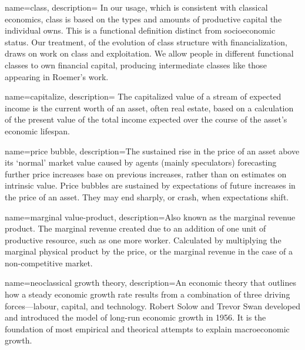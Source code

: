 {
name=class,
description={%
In our usage, which is consistent with classical economics, %
class is based on the types and amounts of productive capital the individual owns. This is a functional definition distinct from socioeconomic status. %
Our treatment, of the evolution of class structure with financialization, draws on \cite{roemerGeneralTheoryExploitation1982} work on class and exploitation. We allow people in different functional classes to own financial capital, producing intermediate classes like those appearing in Roemer's work. %
}
}

{
name=capitalize,
description={%
The capitalized value of a stream of expected income %
is the current worth of an asset, often real estate, based on a calculation of the present value of the total income expected over the course of the asset's economic lifespan.}
}

{
name=price bubble,
description={The sustained rise in the price of an asset above its `normal' market value caused by agents (mainly speculators) forecasting further price increases base on previous increases, rather than on estimates on intrinsic value. Price bubbles are sustained by expectations of future increases in the price of an asset. They may end sharply, or crash, when expectations shift.}
}

{
name=marginal value-product,
description={Also known as the marginal revenue product. The marginal revenue created due to an addition of one unit of productive resource, such as one more worker. Calculated by multiplying the marginal physical product by the price, or the marginal revenue in the case of a non-competitive market.}
}

{
name=neoclassical growth theory,
description={An economic theory that outlines how a steady economic growth rate results from a combination of three driving forces---labour, capital, and technology. Robert Solow and Trevor Swan developed and introduced the model of long-run economic growth in 1956. It is the  foundation of most empirical and theorical attempts to explain macroeconomic growth.}
}


